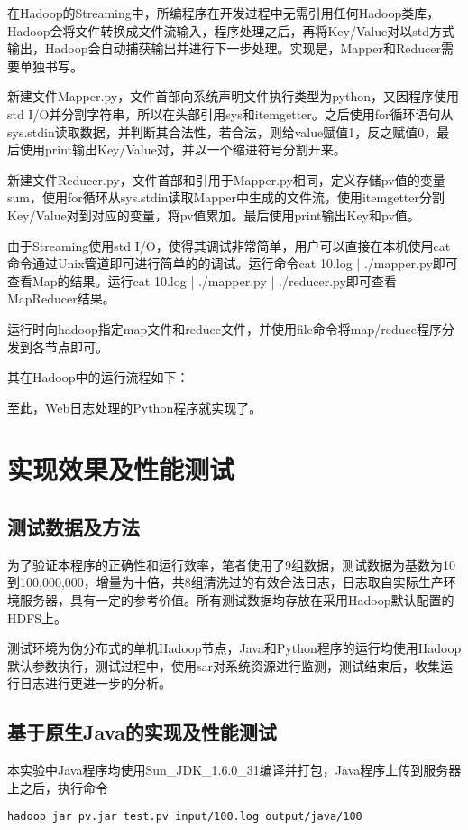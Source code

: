 在Hadoop的Streaming中，所编程序在开发过程中无需引用任何Hadoop类库，Hadoop会将文件转换成文件流输入，程序处理之后，再将Key/Value对以std方式输出，Hadoop会自动捕获输出并进行下一步处理。实现是，Mapper和Reducer需要单独书写。

新建文件Mapper.py，文件首部向系统声明文件执行类型为python，又因程序使用std I/O并分割字符串，所以在头部引用sys和itemgetter。之后使用for循环语句从sys.stdin读取数据，并判断其合法性，若合法，则给value赋值1，反之赋值0，最后使用print输出Key/Value对，并以一个缩进符号分割开来。

新建文件Reducer.py，文件首部和引用于Mapper.py相同，定义存储pv值的变量sum，使用for循环从sys.stdin读取Mapper中生成的文件流，使用itemgetter分割Key/Value对到对应的变量，将pv值累加。最后使用print输出Key和pv值。

由于Streaming使用std I/O，使得其调试非常简单，用户可以直接在本机使用cat命令通过Unix管道即可进行简单的的调试。运行命令cat 10.log | ./mapper.py即可查看Map的结果。运行cat 10.log | ./mapper.py | ./reducer.py即可查看MapReducer结果。

运行时向hadoop指定map文件和reduce文件，并使用file命令将map/reduce程序分发到各节点即可。


其在Hadoop中的运行流程如下：

至此，Web日志处理的Python程序就实现了。

\section{实现效果及性能测试}
\subsection{测试数据及方法}
为了验证本程序的正确性和运行效率，笔者使用了9组数据，测试数据为基数为10到100,000,000，增量为十倍，共8组清洗过的有效合法日志，日志取自实际生产环境服务器，具有一定的参考价值。所有测试数据均存放在采用Hadoop默认配置的HDFS上。

测试环境为伪分布式的单机Hadoop节点，Java和Python程序的运行均使用Hadoop默认参数执行，测试过程中，使用sar对系统资源进行监测，测试结束后，收集运行日志进行更进一步的分析。


\subsection{基于原生Java的实现及性能测试}
本实验中Java程序均使用Sun\_JDK\_1.6.0\_31编译并打包，Java程序上传到服务器上之后，执行命令

\begin{verbatim}
hadoop jar pv.jar test.pv input/100.log output/java/100
\end{verbatim}

